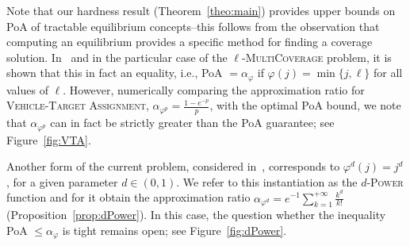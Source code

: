 Note that our hardness result (Theorem~\ref{theo:main}) provides upper bounds on PoA of tractable equilibrium concepts--this follows from the observation that computing an equilibrium provides a specific method for finding a coverage solution. In~\cite{CPM19} and in the particular case of the $\ell$-\textsc{MultiCoverage} problem, it is shown that this in fact an equality, i.e., PoA $=\alpha_{\varphi}$ if $\varphi(j) = \min\{j,\ell\}$ for all values of $\ell$. However, numerically comparing the approximation ratio for \textsc{Vehicle-Target Assignment}, $\alpha_{\varphi^p} = \frac{1 - e^{-p}}{p}$, with the optimal PoA bound, we note that $\alpha_{\varphi^p}$ can in fact be strictly greater than the PoA guarantee; see Figure~\ref{fig:VTA}.

Another form of the current problem, considered in~\cite{PM19}, corresponds to $\varphi^d(j) = j^d$, for a given parameter $d \in (0,1)$. We refer to this instantiation as the $d$-\textsc{Power} function and for it obtain the approximation ratio $\alpha_{\varphi^d} = e^{-1}\sum_{k=1}^{+\infty}\frac{k^d}{k!}$ (Proposition~\ref{prop:dPower}). In this case, the question whether the inequality PoA $\leq \alpha_{\varphi}$ is tight remains open; see Figure~\ref{fig:dPower}.

